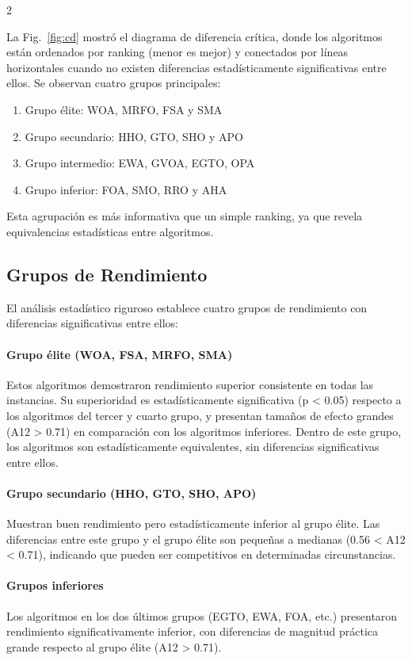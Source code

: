 \documentclass[10pt,a4paper]{extarticle}
\begin{document}
\begin{multicols}{2}

La Fig.~\ref{fig:cd} mostró el diagrama de diferencia crítica, donde los algoritmos están ordenados por ranking (menor es mejor) y conectados por líneas horizontales cuando no existen diferencias estadísticamente significativas entre ellos. Se observan cuatro grupos principales:
\begin{enumerate}
\item Grupo élite: WOA, MRFO, FSA y SMA
\item Grupo secundario: HHO, GTO, SHO y APO
\item Grupo intermedio: EWA, GVOA, EGTO, OPA
\item Grupo inferior: FOA, SMO, RRO y AHA
\end{enumerate}

Esta agrupación es más informativa que un simple ranking, ya que revela equivalencias estadísticas entre algoritmos.

\subsection{Grupos de Rendimiento}
El análisis estadístico riguroso establece cuatro grupos de rendimiento con diferencias significativas entre ellos:

\paragraph{Grupo élite (WOA, FSA, MRFO, SMA)} Estos algoritmos demostraron rendimiento superior consistente en todas las instancias. Su superioridad es estadísticamente significativa (p < 0.05) respecto a los algoritmos del tercer y cuarto grupo, y presentan tamaños de efecto grandes (A12 > 0.71) en comparación con los algoritmos inferiores. Dentro de este grupo, los algoritmos son estadísticamente equivalentes, sin diferencias significativas entre ellos.

\paragraph{Grupo secundario (HHO, GTO, SHO, APO)} Muestran buen rendimiento pero estadísticamente inferior al grupo élite. Las diferencias entre este grupo y el grupo élite son pequeñas a medianas (0.56 < A12 < 0.71), indicando que pueden ser competitivos en determinadas circunstancias.

\paragraph{Grupos inferiores} Los algoritmos en los dos últimos grupos (EGTO, EWA, FOA, etc.) presentaron rendimiento significativamente inferior, con diferencias de magnitud práctica grande respecto al grupo élite (A12 > 0.71).


\end{multicols}
\end{document}
